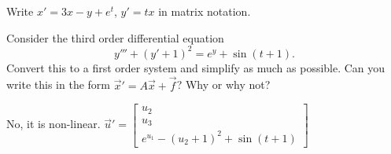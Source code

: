 \begin{exercise}\ansMark%
Write $x'=3x-y+e^t$, $y'=tx$ in matrix notation.
\end{exercise}

\begin{exercise}
Consider the third order differential equation
\begin{equation*}
y''' + (y'+1)^2 = e^y + \sin(t+1).
\end{equation*}
Convert this to a first order system and simplify as much as possible. Can you write this in the form $\vec{x}' = A\vec{x} + \vec{f}$? Why or why not?
\end{exercise}
\comboSol{%
}
{%
No, it is non-linear.
$\vec{u}' = \left[\begin{smallmatrix}  u_2 \\ u_3 \\ e^{u_1} - (u_2 + 1)^2 + \sin(t+1) \end{smallmatrix}\right]$
}

